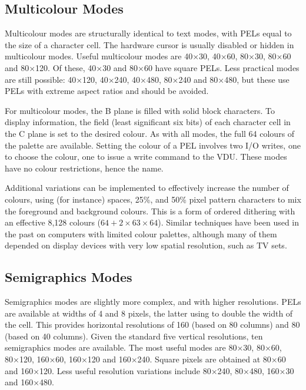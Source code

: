 \subsection{Multicolour Modes}

Multicolour modes are structurally identical to text modes, with \glspl{PEL}
equal to the size of a character cell. The hardware cursor is usually disabled
or hidden in multicolour modes. Useful multicolour modes are 40×30, 40×60,
80×30, 80×60 and 80×120. Of these, 40×30 and 80×60 have square PELs. Less
practical modes are still possible: 40×120, 40×240, 40×480, 80×240 and 80×480,
but these use PELs with extreme aspect ratios and should be avoided.

For multicolour modes, the B plane is filled with solid block characters. To
display information, the  field (least significant six bits)
of each character cell in the C plane is set to the desired colour. As with all
modes, the full 64 colours of the palette are available. Setting the colour of
a PEL involves two I/O writes, one to choose the colour, one to issue a write
command to the VDU. These modes have no colour restrictions, hence the name.

Additional variations can be implemented to effectively increase the number of
colours, using (for instance) spaces, 25\%, and 50\% pixel pattern characters
to mix the foreground and background colours. This is a form of ordered
dithering with an effective 8,128 colours ($64 + 2×63×64$). Similar techniques
have been used in the past on computers with limited colour palettes, although
many of them depended on display devices with very low spatial resolution, such
as TV sets.

\subsection{Semigraphics Modes}

Semigraphics modes are slightly more complex, and with higher
resolutions. \glspl{PEL} are available at widths of 4 and 8 pixels, the latter
using  to double the width of the cell. This provides horizontal
resolutions of 160 (based on 80 columns) and 80 (based on 40 columns). Given
the standard five vertical resolutions, ten semigraphics modes are
available. The most useful modes are 80×30, 80×60, 80×120, 160×60, 160×120 and
160×240. Square pixels are obtained at 80×60 and 160×120. Less useful
resolution variations include 80×240, 80×480, 160×30 and 160×480.

